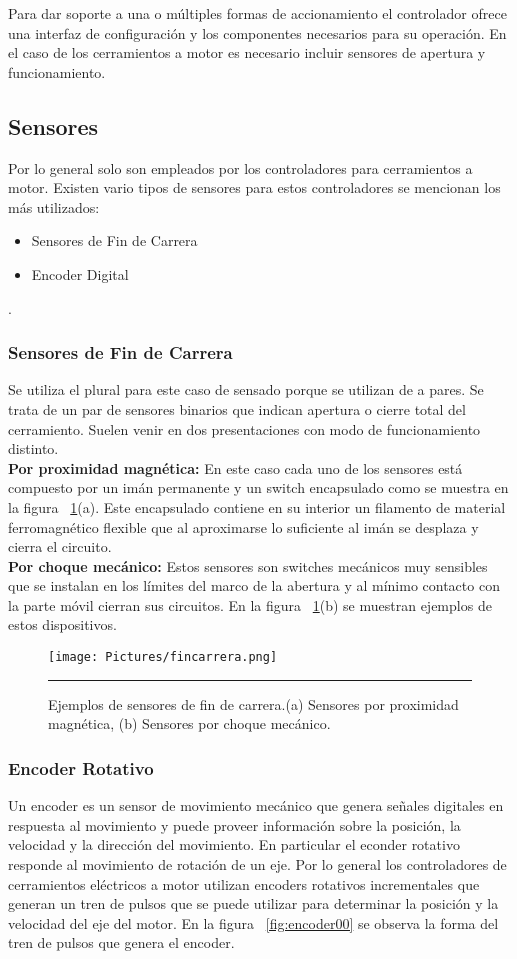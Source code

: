 Para dar soporte a una o múltiples formas de accionamiento el controlador ofrece una interfaz de configuración y los componentes necesarios para su operación.
En el caso de los cerramientos a motor es necesario incluir sensores de apertura y funcionamiento.

\subsection{Sensores}
Por lo general solo son empleados por los controladores para cerramientos a motor. Existen vario tipos de sensores para estos controladores se mencionan los más utilizados:
\begin{itemize}
	\item Sensores de Fin de Carrera
	\item Encoder Digital
\end{itemize}
. 
\subsubsection{Sensores de Fin de Carrera}
\label{section:fincarrera}
Se utiliza el plural para este caso de sensado porque se utilizan de a pares. Se trata de un par de sensores binarios que indican apertura o cierre total del cerramiento.
Suelen venir en dos presentaciones con modo de funcionamiento distinto.\\
\textbf{Por proximidad magnética:} En este caso cada uno de los sensores está compuesto por un imán permanente y un switch encapsulado como se muestra en la figura ~\ref{fig:fincarrera}(a). Este encapsulado contiene en su interior un filamento de material ferromagnético flexible que al aproximarse lo suficiente al imán se desplaza y cierra el circuito.\\
\textbf{Por choque mecánico:} Estos sensores son switches mecánicos muy sensibles que se instalan en los límites del marco de la abertura y al mínimo contacto con la parte móvil cierran sus circuitos. En la figura ~\ref{fig:fincarrera}(b) se muestran ejemplos de estos dispositivos.

\begin{figure}[htbp]
	\centering
	\texttt{[image: Pictures/fincarrera.png]}
	\rule{35em}{1pt}
	\caption[Sensores de fin de carrera]{Ejemplos de sensores de fin de carrera.(a) Sensores por proximidad magnética, (b) Sensores por choque mecánico. }
	\label{fig:fincarrera}
\end{figure}

\subsubsection{Encoder Rotativo}
Un encoder es un sensor de movimiento mecánico que genera señales digitales en respuesta al movimiento y puede proveer  información sobre la posición, la velocidad y la dirección del movimiento. En particular el econder rotativo responde al movimiento de rotación de un eje. Por lo general los controladores de cerramientos eléctricos a motor utilizan encoders rotativos incrementales que generan un tren de pulsos que se puede utilizar para determinar la posición y la velocidad del eje del motor. En la figura ~\ref{fig:encoder00} se observa la forma del tren de pulsos que genera el encoder.

